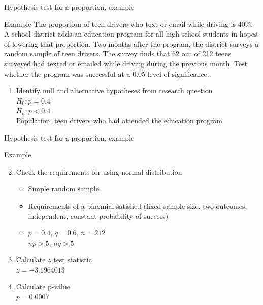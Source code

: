 \documentclass[xcolor=table, aspectratio=169, bigger]{beamer}
\begin{document}
\begin{frame}{Hypothesis test for a proportion, example}
\begin{exampleblock}{Example}
The proportion of teen drivers who text or email while driving is 40\%. A school district adds an education program for all high school students in hopes of lowering that proportion. Two months after the program, the district surveys a random sample of teen drivers. The survey finds that 62 out of 212 teens surveyed had texted or emailed while driving during the previous month. Test whether the program was successful at a 0.05 level of significance.
\begin{enumerate}
\pause\item Identify null and alternative hypotheses from research question\\
\pause$H_0: p = 0.4$\\
$H_a: p < 0.4$\\
Population: teen drivers who had attended the education program
\end{enumerate}
\end{exampleblock}
\end{frame}

\begin{frame}{Hypothesis test for a proportion, example}
\begin{exampleblock}{Example}
\begin{enumerate}
\setcounter{enumi}{1}
\item Check the requirements for using normal distribution
\pause\begin{itemize}
\item Simple random sample
\item Requirements of a binomial satisfied (fixed sample size, two outcomes, independent, constant probability of success)
\item $p=0.4, \, q=0.6, \, n=212$\\
$np > 5, \, nq >5$
\end{itemize}
\pause\item Calculate $z$ test statistic\\
\pause$z = -3.1964013$
\pause\item Calculate p-value\\
\pause$p = 0.0007$
\end{enumerate}
\end{exampleblock}
\end{frame}
\end{document}
